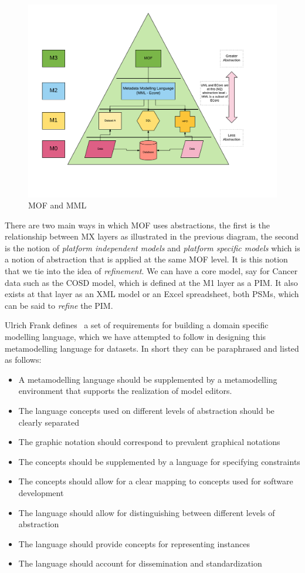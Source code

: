 \documentclass{llncs}
\begin{document}
	\begin{figure}
		\centering
		\includegraphics[scale=0.37]{figures/MMLMOFModel}
		\caption{MOF and MML}
		\label{fig:mofmml}
	\end{figure}

	There are two main ways in which MOF uses abstractions, the first is the relationship between MX layers as illustrated in the previous diagram, the second is the notion of \emph{platform independent models} and \emph{platform specific models} which is a notion of abstraction that is applied at the same MOF level. It is this notion that we tie into the idea of \emph{refinement}. We can have a core model, say for Cancer data such as the COSD model, which is defined at the M1 layer as a PIM. It also exists at that layer as an XML model or an Excel spreadsheet, both PSMs, which can be said to \emph{refine} the PIM. 
	
	Ulrich Frank defines~\cite{Frank2013} a set of requirements for building a domain specific modelling language, which we have attempted to follow in designing this metamodelling language for datasets. In short they can be paraphrased and listed as follows:
	\begin{itemize}
		\item A metamodelling language should be supplemented by a metamodelling environment that supports the realization of model editors.
		\item The language concepts used on different levels of abstraction should be clearly separated
		\item The graphic notation should correspond to prevalent graphical notations
		\item The concepts should be supplemented by a language for specifying constraints
		\item The concepts should allow for a clear mapping to concepts used for software development
		\item The language should allow for distinguishing between different levels of abstraction
		\item The language should provide concepts for representing instances
		\item The language should account for dissemination and standardization
	\end{itemize}
	
\end{document}
